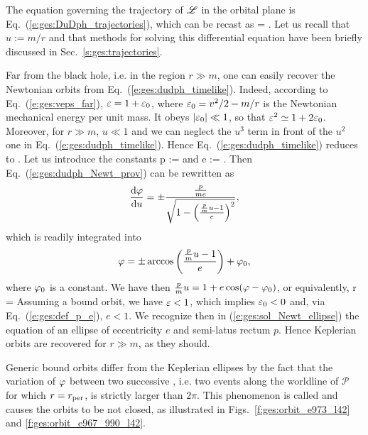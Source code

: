 The equation governing the trajectory of $\mathscr{L}$ in the orbital plane is
Eq.~(\ref{e:ges:DuDph_trajectories}), which can be recast as
\be  \label{e:ges:dudph_timelike}
      = \pm {} .
\ee
Let us recall that $u := m/r$ and that methods for solving this
differential equation have been briefly discussed in Sec.~\ref{s:ges:trajectories}.

\begin{remark}
Far from the black hole, i.e. in the region $r\gg m$, one can easily recover
the Newtonian orbits from Eq.~(\ref{e:ges:dudph_timelike}). Indeed, according to
Eq.~(\ref{e:ges:veps_far}), $\varepsilon = 1 + \varepsilon_0$, where $\varepsilon_0 = v^2/2 -m/r$  is
the Newtonian mechanical energy per unit mass. It obeys $|\varepsilon_0|\ll 1$, so that $\varepsilon^2 \simeq 1 + 2\varepsilon_0$.
Moreover, for $r\gg m$, $u\ll 1$ and we can neglect the $u^3$ term in front
of the $u^2$ one in Eq.~(\ref{e:ges:dudph_timelike}). Hence Eq.~(\ref{e:ges:dudph_timelike})
reduces to
\be \label{e:ges:dudph_Newt_prov}
      \simeq \pm {} .
\ee
Let us introduce the constants
\be \label{e:ges:def_p_e}
    p :=  \qquad\mbox{and}\qquad
    e :=  .
\ee
Then Eq.~(\ref{e:ges:dudph_Newt_prov}) can be rewritten as
\[
    \frac{\mathrm{d} \varphi}{\mathrm{d} u} = \pm \frac{\frac{p}{m e}}{\sqrt{1 - \left(\frac{\frac{p}{m}u-1}{e}\right) ^2}} ,
\]
which is readily integrated into
\[
    \varphi = \pm \arccos \left(\frac{\frac{p}{m}u-1}{e}\right) + \varphi_0 ,
\]
where $\varphi_0$ is a constant. We have then $\frac{p}{m} u = 1 + e\cos(\varphi-\varphi_0)$, or
equivalently,
\be \label{e:ges:sol_Newt_ellipse}
    r = 
\ee
Assuming a bound orbit, we have $\varepsilon < 1$, which implies $\varepsilon_0 < 0$
and, via Eq.~(\ref{e:ges:def_p_e}), $e<1$. We recognize then in (\ref{e:ges:sol_Newt_ellipse}) the equation
of an ellipse of eccentricity $e$ and semi-latus rectum $p$. Hence Keplerian orbits are recovered for $r\gg m$, as they should.
\end{remark}

Generic bound orbits differ from the Keplerian ellipses by the fact that
the variation of $\varphi$ between two successive ,
i.e. two events along the worldline of $\mathscr{P}$ for which $r=r_{\rm per}$,
is strictly larger than $2\pi$. This phenomenon is called 
and causes the orbits to be not closed, as illustrated in Figs.~\ref{f:ges:orbit_e973_l42} and
\ref{f:ges:orbit_e967_990_l42}.


